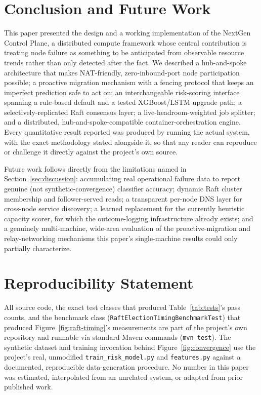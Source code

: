 \documentclass[conference]{IEEEtran}
\begin{document}
\section{Conclusion and Future Work}

This paper presented the design and a working implementation of the NextGen Control Plane, a
distributed compute framework whose central contribution is treating node failure as something to be
anticipated from observable resource trends rather than only detected after the fact. We described a
hub-and-spoke architecture that makes NAT-friendly, zero-inbound-port node participation possible; a
proactive migration mechanism with a fencing protocol that keeps an imperfect prediction safe to act
on; an interchangeable risk-scoring interface spanning a rule-based default and a tested XGBoost/LSTM
upgrade path; a selectively-replicated Raft consensus layer; a live-headroom-weighted job splitter; and
a distributed, hub-and-spoke-compatible container-orchestration engine. Every quantitative result
reported was produced by running the actual system, with the exact methodology stated alongside it, so
that any reader can reproduce or challenge it directly against the project's own source.

Future work follows directly from the limitations named in Section~\ref{sec:discussion}: accumulating
real operational failure data to report genuine (not synthetic-convergence) classifier accuracy;
dynamic Raft cluster membership and follower-served reads; a transparent per-node DNS layer for
cross-node service discovery; a learned replacement for the currently heuristic capacity scorer, for
which the outcome-logging infrastructure already exists; and a genuinely multi-machine, wide-area
evaluation of the proactive-migration and relay-networking mechanisms this paper's single-machine
results could only partially characterize.

\section*{Reproducibility Statement}

All source code, the exact test classes that produced Table~\ref{tab:tests}'s pass counts, and the
benchmark class (\texttt{RaftElectionTimingBenchmarkTest}) that produced
Figure~\ref{fig:raft-timing}'s measurements are part of the project's own repository and runnable via
standard Maven commands (\texttt{mvn test}). The synthetic dataset and training invocation behind
Figure~\ref{fig:convergence} use the project's real, unmodified \texttt{train\_risk\_model.py} and
\texttt{features.py} against a documented, reproducible data-generation procedure. No number in this
paper was estimated, interpolated from an unrelated system, or adapted from prior published work.
\end{document}
